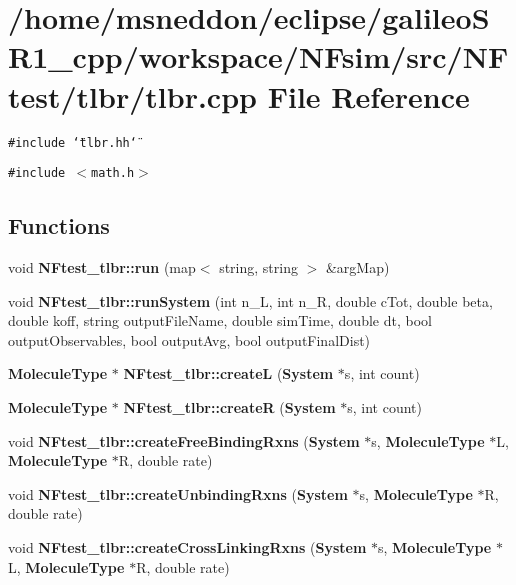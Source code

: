 \section{/home/msneddon/eclipse/galileoSR1\_\-cpp/workspace/NFsim/src/NFtest/tlbr/tlbr.cpp File Reference}
\label{tlbr_8cpp}


{\tt \#include \char`\"{}tlbr.hh\char`\"{}}\par
{\tt \#include $<$math.h$>$}\par
\subsection*{Functions}
\begin{CompactItemize}
\item 
void {\bf NFtest\_\-tlbr::run} (map$<$ string, string $>$ \&argMap)
\item 
void {\bf NFtest\_\-tlbr::runSystem} (int n\_\-L, int n\_\-R, double cTot, double beta, double koff, string outputFileName, double simTime, double dt, bool outputObservables, bool outputAvg, bool outputFinalDist)
\item 
{\bf MoleculeType} $\ast$ {\bf NFtest\_\-tlbr::createL} ({\bf System} $\ast$s, int count)
\item 
{\bf MoleculeType} $\ast$ {\bf NFtest\_\-tlbr::createR} ({\bf System} $\ast$s, int count)
\item 
void {\bf NFtest\_\-tlbr::createFreeBindingRxns} ({\bf System} $\ast$s, {\bf MoleculeType} $\ast$L, {\bf MoleculeType} $\ast$R, double rate)
\item 
void {\bf NFtest\_\-tlbr::createUnbindingRxns} ({\bf System} $\ast$s, {\bf MoleculeType} $\ast$R, double rate)
\item 
void {\bf NFtest\_\-tlbr::createCrossLinkingRxns} ({\bf System} $\ast$s, {\bf MoleculeType} $\ast$L, {\bf MoleculeType} $\ast$R, double rate)
\end{CompactItemize}
